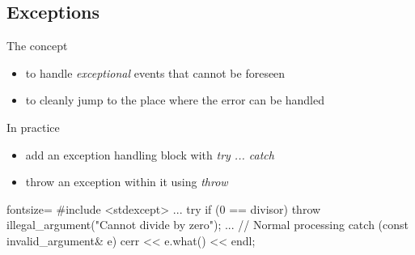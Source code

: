 \subsection[except]{Exceptions}

\begin{frame}[fragile]
  \begin{block}{The concept}
    \begin{itemize}
      \item to handle \textit{exceptional} events that cannot be foreseen
      \item to cleanly jump to the place where the error can be handled
    \end{itemize}
  \end{block}
  \begin{block}{In practice}
    \begin{itemize}
      \item add an exception handling block with {\it try ... catch}
      \item throw an exception within it using {\it throw}
    \end{itemize}
  \end{block}
  \begin{cppcode*}{fontsize=\scriptsize}
    #include <stdexcept>
    ...
    try {
      if (0 == divisor) {
        throw illegal_argument("Cannot divide by zero");
      }
      ... // Normal processing
    } catch (const invalid_argument& e) {
      cerr << e.what() << endl;
    }
  \end{cppcode*}
\end{frame}

